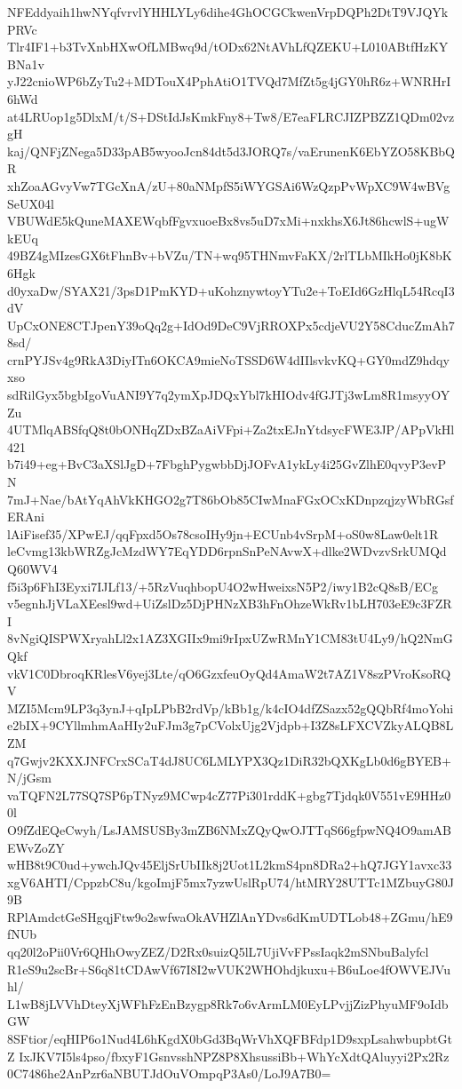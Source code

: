 NFEddyaih1hwNYqfvrvlYHHLYLy6dihe4GhOCGCkwenVrpDQPh2DtT9VJQYkPRVc
Tlr4IF1+b3TvXnbHXwOfLMBwq9d/tODx62NtAVhLfQZEKU+L010ABtfHzKYBNa1v
yJ22cnioWP6bZyTu2+MDTouX4PphAtiO1TVQd7MfZt5g4jGY0hR6z+WNRHrI6hWd
at4LRUop1g5DlxM/t/S+DStIdJsKmkFny8+Tw8/E7eaFLRCJIZPBZZ1QDm02vzgH
kaj/QNFjZNega5D33pAB5wyooJcn84dt5d3JORQ7s/vaErunenK6EbYZO58KBbQR
xhZoaAGvyVw7TGcXnA/zU+80aNMpfS5iWYGSAi6WzQzpPvWpXC9W4wBVgSeUX04l
VBUWdE5kQuneMAXEWqbfFgvxuoeBx8vs5uD7xMi+nxkhsX6Jt86hcwlS+ugWkEUq
49BZ4gMIzesGX6tFhnBv+bVZu/TN+wq95THNmvFaKX/2rlTLbMIkHo0jK8bK6Hgk
d0yxaDw/SYAX21/3psD1PmKYD+uKohznywtoyYTu2e+ToEId6GzHlqL54RcqI3dV
UpCxONE8CTJpenY39oQq2g+IdOd9DeC9VjRROXPx5cdjeVU2Y58CducZmAh78sd/
crnPYJSv4g9RkA3DiyITn6OKCA9mieNoTSSD6W4dIIlsvkvKQ+GY0mdZ9hdqyxso
sdRilGyx5bgbIgoVuANI9Y7q2ymXpJDQxYbl7kHIOdv4fGJTj3wLm8R1msyyOYZu
4UTMlqABSfqQ8t0bONHqZDxBZaAiVFpi+Za2txEJnYtdsycFWE3JP/APpVkHl421
b7i49+eg+BvC3aXSlJgD+7FbghPygwbbDjJOFvA1ykLy4i25GvZlhE0qvyP3evPN
7mJ+Nae/bAtYqAhVkKHGO2g7T86bOb85CIwMnaFGxOCxKDnpzqjzyWbRGsfERAni
lAiFisef35/XPwEJ/qqFpxd5Os78csoIHy9jn+ECUnb4vSrpM+oS0w8Law0elt1R
leCvmg13kbWRZgJcMzdWY7EqYDD6rpnSnPeNAvwX+dlke2WDvzvSrkUMQdQ60WV4
f5i3p6FhI3Eyxi7IJLf13/+5RzVuqhbopU4O2wHweixsN5P2/iwy1B2cQ8sB/ECg
v5egnhJjVLaXEesl9wd+UiZslDz5DjPHNzXB3hFnOhzeWkRv1bLH703eE9c3FZRI
8vNgiQISPWXryahLl2x1AZ3XGIIx9mi9rIpxUZwRMnY1CM83tU4Ly9/hQ2NmGQkf
vkV1C0DbroqKRlesV6yej3Lte/qO6GzxfeuOyQd4AmaW2t7AZ1V8szPVroKsoRQV
MZI5Mcm9LP3q3ynJ+qIpLPbB2rdVp/kBb1g/k4cIO4dfZSazx52gQQbRf4moYohi
e2bIX+9CYllmhmAaHIy2uFJm3g7pCVolxUjg2Vjdpb+I3Z8sLFXCVZkyALQB8LZM
q7Gwjv2KXXJNFCrxSCaT4dJ8UC6LMLYPX3Qz1DiR32bQXKgLb0d6gBYEB+N/jGsm
vaTQFN2L77SQ7SP6pTNyz9MCwp4cZ77Pi301rddK+gbg7Tjdqk0V551vE9HHz00l
O9fZdEQeCwyh/LsJAMSUSBy3mZB6NMxZQyQwOJTTqS66gfpwNQ4O9amABEWvZoZY
wHB8t9C0ud+ywchJQv45EljSrUbIIk8j2Uot1L2kmS4pn8DRa2+hQ7JGY1avxc33
xgV6AHTI/CppzbC8u/kgoImjF5mx7yzwUslRpU74/htMRY28UTTc1MZbuyG80J9B
RPlAmdctGeSHgqjFtw9o2swfwaOkAVHZlAnYDvs6dKmUDTLob48+ZGmu/hE9fNUb
qq20l2oPii0Vr6QHhOwyZEZ/D2Rx0suizQ5lL7UjiVvFPssIaqk2mSNbuBalyfcl
R1eS9u2scBr+S6q81tCDAwVf67I8I2wVUK2WHOhdjkuxu+B6uLoe4fOWVEJVuhl/
L1wB8jLVVhDteyXjWFhFzEnBzygp8Rk7o6vArmLM0EyLPvjjZizPhyuMF9oIdbGW
8SFtior/eqHIP6o1Nud4L6hKgdX0bGd3BqWrVhXQFBFdp1D9sxpLsahwbupbtGtZ
IxJKV7I5ls4pso/fbxyF1GsnvsshNPZ8P8XhsussiBb+WhYcXdtQAluyyi2Px2Rz
0C7486he2AnPzr6aNBUTJdOuVOmpqP3As0/LoJ9A7B0=
